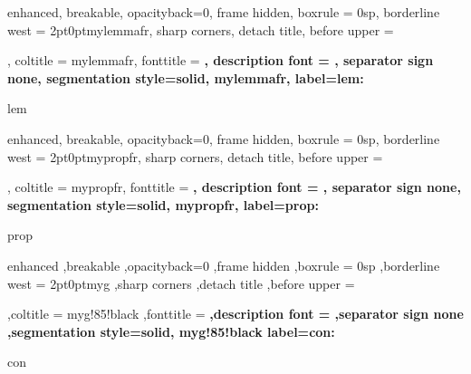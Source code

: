 {%
	enhanced,
	breakable,
	opacityback=0,
	frame hidden,
	boxrule = 0sp,
	borderline west = {2pt}{0pt}{mylemmafr},
	sharp corners,
	detach title,
	before upper = \tcbtitle\par\smallskip,
	coltitle = mylemmafr,
	fonttitle = \bfseries\sffamily,
	description font = \mdseries,
	separator sign none,
	segmentation style={solid, mylemmafr},
    label={lem:\thetcbcounter}
}
{lem}



{%
	enhanced,
	breakable,	
	opacityback=0,
	frame hidden,
	boxrule = 0sp,
	borderline west = {2pt}{0pt}{mypropfr},
	sharp corners,
	detach title,
	before upper = \tcbtitle\par\smallskip,
	coltitle = mypropfr,
	fonttitle = \bfseries\sffamily,
	description font = \mdseries,
	separator sign none,
	segmentation style={solid, mypropfr},
    label={prop:\thetcbcounter}
}
{prop}

{%
	enhanced
	,breakable
	,opacityback=0
	,frame hidden
	,boxrule = 0sp
	,borderline west = {2pt}{0pt}{myg}
	,sharp corners
	,detach title
	,before upper = \tcbtitle\par\smallskip
	,coltitle = myg!85!black
	,fonttitle = \bfseries\sffamily
	,description font = \mdseries
	,separator sign none
	,segmentation style={solid, myg!85!black}
    label={con:\thetcbcounter}
}
{con}
\makeatother


